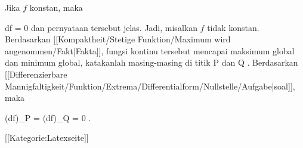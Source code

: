 Jika $f$ konstan, maka

\mavergleichskette
{\vergleichskette
{ df
}
{ = }{ 0
}
{  }{
}
{    }{
}
{   }{
}
}
{}{}{}
dan pernyataan tersebut jelas. Jadi, misalkan $f$ tidak konstan. Berdasarkan
[[Kompaktheit/Stetige Funktion/Maximum wird angenommen/Fakt|Fakta]],
fungsi kontinu tersebut mencapai maksimum global dan minimum global, katakanlah masing-masing di titik
\mathkor {} {P} {dan} {Q} {.}
Berdasarkan
[[Differenzierbare Mannigfaltigkeit/Funktion/Extrema/Differentialform/Nullstelle/Aufgabe|soal]],
maka

\mavergleichskettedisp
{\vergleichskette
{ (df)_P
}
{ =} { (df)_Q
}
{ =} { 0
}
{ } {
}
{ } {
}
}
{}{}{.}

 [[Kategorie:Latexseite]]

